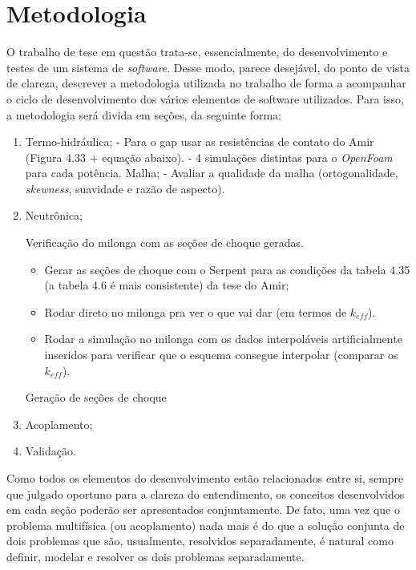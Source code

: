 \chapter{Metodologia}
\label{chap:metodologia}

O trabalho de tese em questão trata-se, essencialmente, do desenvolvimento e testes
de um sistema de \textit{software}. Desse modo, parece desejável, do ponto de vista de
clareza, descrever a metodologia utilizada no trabalho de forma a acompanhar o ciclo
de desenvolvimento dos vários elementos de software utilizados. Para isso, a metodologia
será divida em seções, da seguinte forma:
\begin{enumerate}
\item Termo-hidráulica;
  - Para o gap usar as resistências de contato do Amir (Figura 4.33 + equação abaixo).
  - 4 simulações distintas para o \textit{OpenFoam} para cada potência.
  \subitem Malha;
  - Avaliar a qualidade da malha (ortogonalidade, \textit{skewness},
  suavidade e razão de aspecto).
\item Neutrônica;

  Verificação do milonga com as seções de choque geradas.
  
  \begin{itemize}
  \item Gerar as seções de choque com o Serpent para as condições da tabela 4.35 (a tabela 4.6 é mais consistente) da tese do Amir;
  \item Rodar direto no milonga pra ver o que vai dar (em termos de \textit{$k_{eff}$}).
  \item Rodar a simulação no milonga com os dados interpoláveis artificialmente inseridos para verificar que o esquema consegue interpolar (comparar os \textit{$k_{eff}$}).
  \end{itemize}

  \subitem Geração de seções de choque

\item Acoplamento;
\item Validação.
\end{enumerate}

Como todos os elementos do desenvolvimento estão relacionados entre si, sempre que
julgado oportuno para a clareza do entendimento, os conceitos desenvolvidos em cada
seção poderão ser apresentados conjuntamente. De fato, uma vez que o problema multifísica
(ou acoplamento) nada mais é do que a solução conjunta de dois problemas que são,
usualmente, resolvidos separadamente, é natural como definir, modelar e resolver os
dois problemas separadamente.

